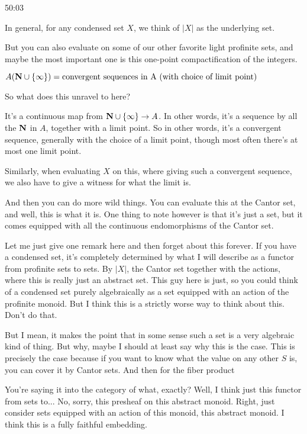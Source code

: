 \begin{example}
\begin{unfinished}{50:03}
\begin{example}[\yt{1h06m05s}{}]
In general, for any condensed set $X$, we think of $|X|$ as the underlying set. 

But you can also evaluate on some of our other favorite light profinite sets, and maybe the most important one is this one-point compactification of the integers. 

$ A ( \mathbf N \cup \{\infty\} ) = \text{convergent sequences in A (with choice of limit point) }$ %

So what does this unravel to here?


It's a continuous map from $\mathbf N \cup \{\infty\} \to A$. In other words, it's a sequence by all the $\mathbf N$ in $A$, together with a limit point. 
So in other words, it's a convergent sequence, generally with the choice of a limit point, though most often there's at most one limit point. 

Similarly, when evaluating $X$ on this, where giving such a convergent sequence, we also have to give a witness for what the limit is.

And then you can do more wild things. You can evaluate this at the Cantor set, and well, this is what it is. One thing to note however is that it's just a set, but it comes equipped with all the continuous endomorphisms of the Cantor set.

\end{example}

\begin{remark}
Let me just give one remark here and then forget about this forever. If you have a condensed set, it's completely determined by what I will describe as a functor from profinite sets to sets. By $|X|$, the Cantor set together with the actions, where this is really just an abstract set. This guy here is just, so you could think of a condensed set purely algebraically as a set equipped with an action of the profinite monoid. But I think this is a strictly worse way to think about this. Don't do that.

But I mean, it makes the point that in some sense such a set is a very algebraic kind of thing. But why, maybe I should at least say why this is the case. This is precisely the case because if you want to know what the value on any other $S$ is, you can cover it by Cantor sets. And then for the fiber product

You're saying it into the category of what, exactly? Well, I think just this functor from sets to... No, sorry, this presheaf on this abstract monoid. Right, just consider sets equipped with an action of this monoid, this abstract monoid. I think this is a fully faithful embedding.


\end{remark}
\end{unfinished}
\end{example}
